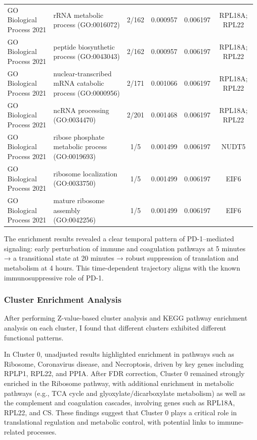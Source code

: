 \documentclass{article}
\begin{document}
\begin{table}[H]
{\begin{tabular}{@{}llcccc@{}}
              GO Biological Process 2021 & rRNA metabolic process (GO:0016072) & 2/162 & 0.000957 & 0.006197 & RPL18A; RPL22 \\
              GO Biological Process 2021 & peptide biosynthetic process (GO:0043043) & 2/162 & 0.000957 & 0.006197 & RPL18A; RPL22 \\
              GO Biological Process 2021 & nuclear-transcribed mRNA catabolic process (GO:0000956) & 2/171 & 0.001066 & 0.006197 & RPL18A; RPL22 \\
              GO Biological Process 2021 & ncRNA processing (GO:0034470) & 2/201 & 0.001468 & 0.006197 & RPL18A; RPL22 \\
              GO Biological Process 2021 & ribose phosphate metabolic process (GO:0019693) & 1/5   & 0.001499 & 0.006197 & NUDT5 \\
              GO Biological Process 2021 & ribosome localization (GO:0033750) & 1/5   & 0.001499 & 0.006197 & EIF6 \\
              GO Biological Process 2021 & mature ribosome assembly (GO:0042256) & 1/5   & 0.001499 & 0.006197 & EIF6 \\ \bottomrule
            \end{tabular}
          }

        \end{table}

        The enrichment results revealed a clear temporal pattern of PD-1–mediated signaling: early perturbation of immune and coagulation pathways at 5 minutes → a transitional state at 20 minutes → robust suppression of translation and metabolism at 4 hours. This time-dependent trajectory aligns with the known immunosuppressive role of PD-1.

      \subsubsection{Cluster Enrichment Analysis}

        After performing Z-value-based cluster analysis and KEGG pathway enrichment analysis on each cluster, I found that different clusters exhibited different functional patterns.

        In Cluster 0, unadjusted results highlighted enrichment in pathways such as Ribosome, Coronavirus disease, and Necroptosis, driven by key genes including RPLP1, RPL22, and PPIA. After FDR correction, Cluster 0 remained strongly enriched in the Ribosome pathway, with additional enrichment in metabolic pathways (e.g., TCA cycle and glyoxylate/dicarboxylate metabolism) as well as the complement and coagulation cascades, involving genes such as RPL18A, RPL22, and CS. These findings suggest that Cluster 0 plays a critical role in translational regulation and metabolic control, with potential links to immune-related processes.
\end{document}
